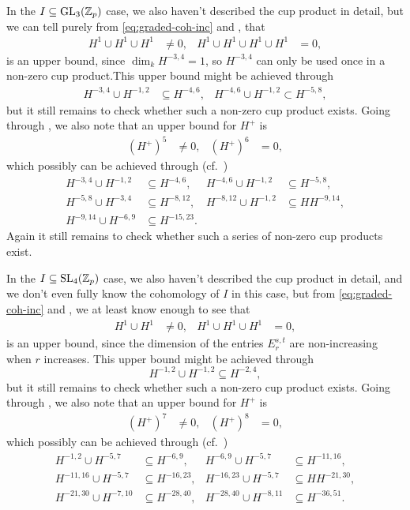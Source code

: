 In the $I \subseteq \operatorname{GL}_{3}(\mathbb{Z}_{p})$ case, we also haven't described the cup product in detail, but we can tell purely from \eqref{eq:graded-coh-inc} and , that
\begin{align*}
  H^{1} \cup H^{1} \cup H^{1} &\neq 0, & H^{1} \cup H^{1} \cup H^{1} \cup H^{1} &= 0,
\end{align*}
is an upper bound, since $\dim_{k} H^{-3,4} = 1$, so $H^{-3,4}$ can only be used once in a non-zero cup product.This upper bound might be achieved through
\begin{align*}
  H^{-3,4} \cup H^{-1,2} &\subseteq H^{-4,6}, & H^{-4,6} \cup H^{-1,2} \subset H^{-5,8},
\end{align*}
but it still remains to check whether such a non-zero cup product exists. Going through , we also note that an upper bound for $H^{+}$ is
\begin{align*}
  (H^{+})^{5} &\neq 0, & (H^{+})^{6} &= 0,
\end{align*}
which possibly can be achieved through (cf.\ \cite{code})
\begin{align*}
  H^{-3,4} \cup H^{-1,2} &\subseteq H^{-4,6}, & H^{-4,6} \cup H^{-1,2} &\subseteq H^{-5,8}, \\
  H^{-5,8} \cup H^{-3,4} &\subseteq H^{-8,12}, & H^{-8,12} \cup H^{-1,2} &\subseteq HH^{-9,14}, \\
  H^{-9,14} \cup H^{-6,9} &\subseteq H^{-15,23}.
\end{align*}
Again it still remains to check whether such a series of non-zero cup products exist.

In the $I \subseteq \operatorname{SL}_{4}(\mathbb{Z}_{p})$ case, we also haven't described the cup product in detail, and we don't even fully know the cohomology of $I$ in this case, but from \eqref{eq:graded-coh-inc} and , we at least know enough to see that
\begin{align*}
  H^{1} \cup H^{1} &\neq 0, & H^{1} \cup H^{1} \cup H^{1} &= 0,
\end{align*}
is an upper bound, since the dimension of the entries $E_{r}^{s,t}$ are non-increasing when $r$ increases. This upper bound might be achieved through
\begin{equation*}
  H^{-1,2} \cup H^{-1,2} \subseteq H^{-2,4},
\end{equation*}
but it still remains to check whether such a non-zero cup product exists. Going through , we also note that an upper bound for $H^{+}$ is
\begin{align*}
  (H^{+})^{7} &\neq 0, & (H^{+})^{8} &= 0,
\end{align*}
which possibly can be achieved through (cf.\ \cite{code})
\begin{align*}
  H^{-1,2} \cup H^{-5,7} &\subseteq H^{-6,9}, & H^{-6,9} \cup H^{-5,7} &\subseteq H^{-11,16}, \\
  H^{-11,16} \cup H^{-5,7} &\subseteq H^{-16,23}, & H^{-16,23} \cup H^{-5,7} &\subseteq HH^{-21,30}, \\
  H^{-21,30} \cup H^{-7,10} &\subseteq H^{-28,40}, & H^{-28,40} \cup H^{-8,11} &\subseteq H^{-36,51}.
\end{align*}

